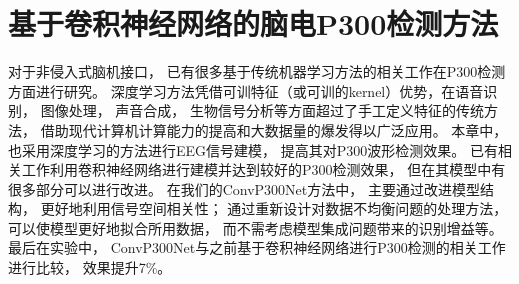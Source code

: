 \chapter{基于卷积神经网络的脑电P300检测方法}

对于非侵入式脑机接口， 已有很多基于传统机器学习方法的相关工作在P300检测方面进行研究。 深度学习方法凭借可训特征（或可训的kernel）优势，在语音识别， 图像处理， 声音合成， 生物信号分析等方面超过了手工定义特征的传统方法， 借助现代计算机计算能力的提高和大数据量的爆发得以广泛应用。 本章中， 也采用深度学习的方法进行EEG信号建模， 提高其对P300波形检测效果。 已有相关工作利用卷积神经网络进行建模并达到较好的P300检测效果， 但在其模型中有很多部分可以进行改进。 在我们的ConvP300Net方法中， 主要通过改进模型结构， 更好地利用信号空间相关性； 通过重新设计对数据不均衡问题的处理方法， 可以使模型更好地拟合所用数据， 而不需考虑模型集成问题带来的识别增益等。 最后在实验中， ConvP300Net与之前基于卷积神经网络进行P300检测的相关工作进行比较， 效果提升7\%。




